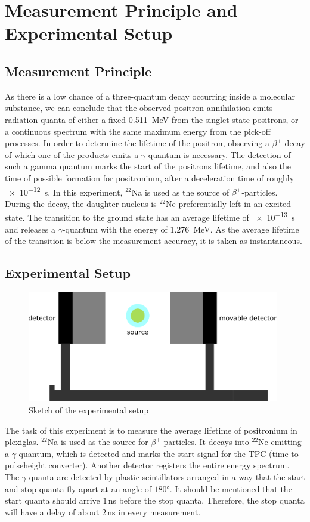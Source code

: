 \chapter{Measurement Principle and Experimental Setup}
\section{Measurement Principle}
As there is a low chance of a three-quantum decay occurring inside a molecular substance, we can conclude that the observed positron annihilation  emits radiation quanta of either a fixed \SI{0.511}{MeV} from the singlet state positrons, or a continuous spectrum with the same maximum energy from the pick-off processes.
In order to determine the lifetime of the positron, observing a $\beta^+$-decay of which one of the products emits a $\gamma$ quantum is necessary. The detection of such a gamma quantum marks the start of the positrons lifetime, and also the time of possible formation for positronium, after a deceleration time of roughly   
\SI{e-12}{s}. In this experiment, $^{22}$Na is used
as the source of $\beta^+$-particles. During the decay, the  daughter nucleus is $^22$Ne preferentially left in an excited state. The transition to the ground state has an average lifetime of \SI{e-13}{s} and releases a $\gamma$-quantum with the energy of \SI{1.276}{MeV}. As the average lifetime of the transition is below the measurement accuracy, it is taken as instantaneous. 

\section{Experimental Setup}

\begin{figure}[H]
    \centering
    \includegraphics[width=110mm,scale=0.5]{Positronium/include/positronium.png}
    \caption{Sketch of the experimental setup} 
    \label{fig:Versuchsaufbau}
\end{figure}

The task of this experiment is to measure the average lifetime of positronium in plexiglas. $^{22}$Na is used as the source for $\beta ^{+}$-particles. It decays into $^{22}$Ne emitting a $\gamma$-quantum, which is detected and marks the start signal for the TPC (time to pulseheight converter). Another detector registers the entire energy spectrum. The $\gamma$-quanta are detected by plastic scintillators arranged in a way that the start and stop quanta fly apart at an angle of $180$°. It should be mentioned that the start quanta should arrive $1\,$ns before the stop quanta. Therefore, the stop quanta will have a delay of about $2$\,ns in every measurement.
